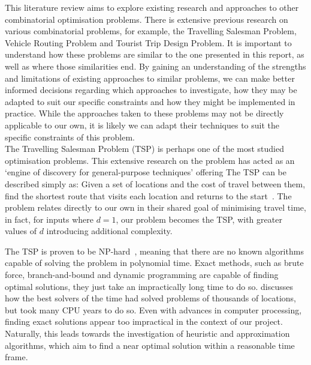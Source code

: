 This literature review aims to explore existing research and approaches to other combinatorial optimisation problems.
There is extensive previous research on various combinatorial problems, for example, the Travelling Salesman
Problem, Vehicle Routing Problem and Tourist Trip Design Problem.
It is important to understand how these problems are similar to the one presented in this report, as well as where
those similarities end.
By gaining an understanding of the strengths and limitations of existing approaches to similar problems, we can make
better informed decisions regarding which approaches to investigate, how they may be adapted to suit our specific
constraints and how they might be implemented in practice.
While the approaches taken to these problems may not be directly applicable to our own, it is likely we can adapt their
techniques to suit the specific constraints of this problem.\\

\noindent
The Travelling Salesman Problem (TSP) is perhaps one of the most studied optimisation problems.
This extensive research on the problem has acted as an `engine of discovery for general-purpose techniques' offering
The TSP can be described simply as: Given a set of locations and the cost of travel between them, find the shortest
route that visits each location and returns to the start~\parencite[p. 1]{applegate2006traveling}.
The problem relates directly to our own in their shared goal of minimising travel time, in fact, for inputs where
$d = 1$, our problem becomes the TSP, with greater values of $d$ introducing additional complexity.

The TSP is proven to be NP-hard~\parencite[p. 1096--1097]{cormen2022introduction}, meaning that there
are no known algorithms capable of solving the problem in polynomial time.
Exact methods, such as brute force, branch-and-bound and dynamic programming are capable of finding optimal
solutions, they just take an impractically long time to do so.
\textcite[p. 489--530]{applegate2006traveling} discusses how the best solvers of the time had solved problems of
thousands of locations, but took many CPU years to do so.
Even with advances in computer processing, finding exact solutions appear too impractical in the context of our project.
Naturally, this leads towards the investigation of heuristic and approximation algorithms, which aim to find a near
optimal solution within a reasonable time frame.


